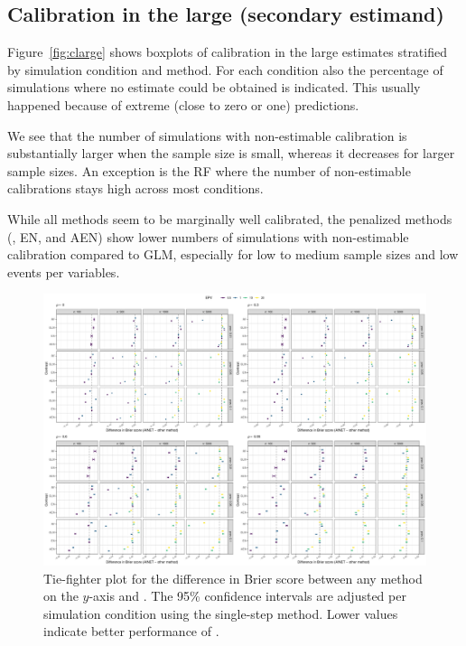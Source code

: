 \subsection{Calibration in the large (secondary estimand)}
Figure~\ref{fig:clarge} shows boxplots of calibration in the large estimates
stratified by simulation condition and method. For each condition also the
percentage of simulations where no estimate could be obtained is indicated.
This usually happened because of extreme (close to zero or one) predictions.

We see that the number of simulations with non-estimable calibration is
substantially larger when the sample size is small, whereas it decreases for
larger sample sizes. An exception is the RF where the number of non-estimable
calibrations stays high across most conditions.

While all methods seem to be marginally well calibrated, the penalized methods
(\ainet{}, EN, and AEN) show lower numbers of simulations with non-estimable
calibration compared to GLM, especially for low to medium sample sizes and low
events per variables.

\begin{landscape}
\begin{figure}[!ht]
\center
\includegraphics[width=0.9\linewidth]{figures-appendix/tie-fighter_brier.pdf}
\caption{Tie-fighter plot for the difference in Brier score between any method
  on the $y$-axis and \ainet{}. The 95\% confidence intervals are adjusted per
  simulation condition using the single-step method. Lower values indicate
  better performance of \ainet{}. } \label{fig:tiebrier}
\end{figure}
\end{landscape}

